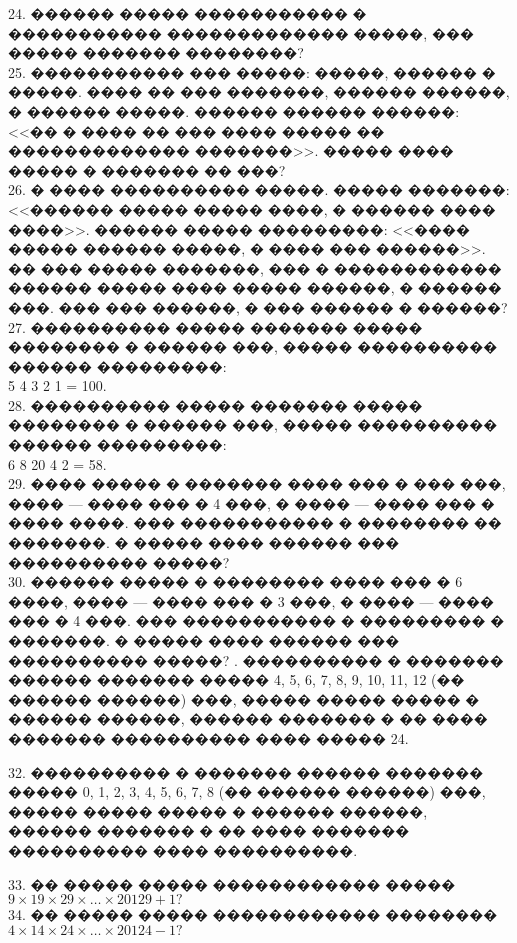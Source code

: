 \documentclass[12pt]{article}
\begin{document}
24. ������ ����� ����������� � ����������� ������������� �����, ��� ����� ������� ��������?\\
25. ����������� ��� �����: �����, ������ � �����. ���� �� ��� �������, ������ ������, � ������ �����. ������ ������ ������: <<�� � ���� �� ��� ���� ����� �� ������������� �������>>. ����� ���� ����� � ������� �� ���?\\
26. � ���� ���������� �����. ����� �������: <<������ ����� ����� ����, � ������ ���� ����>>. ������ ����� ���������: <<���� ����� ������ �����, � ���� ��� ������>>. �� ��� ����� �������, ��� � ������������ ������ ����� ���� ����� ������, � ������ ���. ��� ��� ������, � ��� ������ � ������?\\
27. ���������� ����� ������� ����� �������� � ������ ���, ����� ���������� ������ ���������:\\ 5 4 3 2 1 = 100.\\
28. ���������� ����� ������� ����� �������� � ������ ���, ����� ���������� ������ ���������:\\ 6 8 20 4 2 = 58.\\
29. ���� ����� � ������� ���� ��� � ��� ���, ���� --- ���� ��� � 4 ���, � ���� --- ���� ��� � ���� ����. ��� ����������� � �������� �� �������. � ����� ���� ������ ��� ���������� �����?\\
30. ������ ����� � �������� ���� ��� � 6 ����, ���� --- ���� ��� � 3 ���, � ���� --- ���� ��� � 4 ���. ��� ����������� � ��������� � �������. � ����� ���� ������ ��� ���������� �����?
\newpage
{}. ���������� � ������� ������ ������� ����� 4, 5, 6, 7, 8, 9, 10, 11, 12 (�� ������ ������) ���, ����� ����� ����� � ������ ������, ������ ������� � �� ���� ������� ���������� ���� ����� 24.
\begin{center}
\begin{figure}[ht!]
\end{figure}
\end{center}
32. ���������� � ������� ������ ������� ����� 0, 1, 2, 3, 4, 5, 6, 7, 8 (�� ������ ������) ���, ����� ����� ����� � ������ ������, ������ ������� � �� ���� ������� ���������� ���� ����������.
\begin{center}
\begin{figure}[ht!]
\end{figure}
\end{center}
33. �� ����� ����� ������������ ����� $9\times19\times29\times\ldots\times20129+1?$\\
34. �� ����� ����� ������������ �������� $4\times14\times24\times\ldots\times20124-1?$\\
\end{document}
